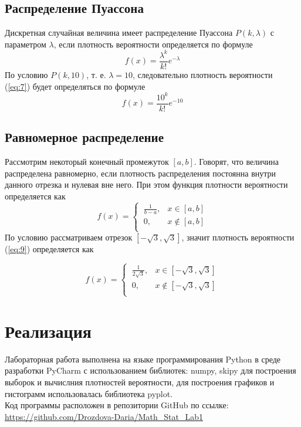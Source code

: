 \documentclass{article}
\begin{document}
\subsection{Распределение Пуассона}
Дискретная случайная величина имеет распределение Пуассона $P(k,\lambda)$ с параметром $\lambda$, если плотность вероятности определяется по формуле
\begin{equation}
f(x)=\frac{\lambda^k}{k!}e^{-\lambda}
\label{eq:7}
\end{equation}
По условию $P(k,10)$, т. е. $\lambda=10$, следовательно плотность вероятности (\ref{eq:7}) будет определяться по формуле
\begin{equation}
f(x)=\frac{10^k}{k!}e^{-10}
\label{eq:8}
\end{equation}

\subsection{Равномерное распределение}
Рассмотрим некоторый конечный промежуток $[a,b]$. Говорят, что величина распределена равномерно, если плотность распределения постоянна внутри данного отрезка и нулевая вне него. При этом функция плотности вероятности определяется как
\begin{equation}
f(x)=\left \{\ \begin{array}{rcl}
\frac{1}{b-a}, & x\in[a,b] \\
0, & x \notin [a,b] \\
\end{array}\right.
\label{eq:9}
\end{equation}
По условию рассматриваем отрезок $[-\sqrt{3},\sqrt{3}]$, значит плотность вероятности (\ref{eq:9}) определяется как

\begin{equation}
f(x)=\left \{\ \begin{array}{rcl}
\frac{1}{2\sqrt{3}}, & x\in[-\sqrt{3},\sqrt{3}] \\
0, & x \notin [-\sqrt{3},\sqrt{3}] \\
\end{array}\right.
\label{eq:10}
\end{equation}

\newpage
\section{Реализация}
Лабораторная работа выполнена на языке программирования Python в среде разработки PyCharm с использованием библиотек: numpy, skipy для построения выборок и вычислния плотностей вероятности, для построения графиков и гистограмм использовалась библиотека pyplot.
\\
Код программы расположен в репозитории GitHub по ссылке: \url{https://github.com/Drozdova-Daria/Math_Stat_Lab1}
\newpage
\end{document}

